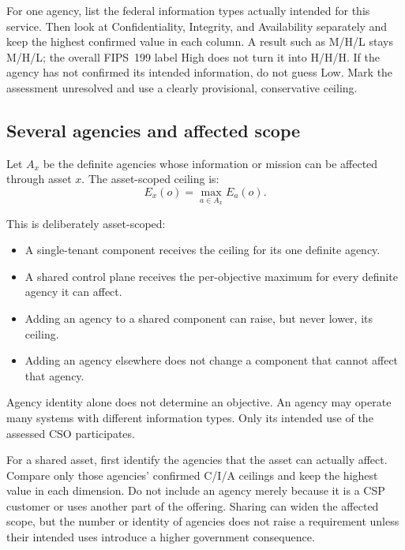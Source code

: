 \documentclass[11pt]{article}
\begin{document}
\begin{plain}
For one agency, list the federal information types actually intended for this
service. Then look at Confidentiality, Integrity, and Availability separately and
keep the highest confirmed value in each column. A result such as M/H/L stays
M/H/L; the overall FIPS~199 label High does not turn it into H/H/H. If the agency
has not confirmed its intended information, do not guess Low. Mark the assessment
unresolved and use a clearly provisional, conservative ceiling.
\end{plain}

\subsection{Several agencies and affected scope}

Let $A_x$ be the definite agencies whose information or mission can be affected
through asset $x$. The asset-scoped ceiling is:
\begin{equation}
E_x(o)=\max_{a\in A_x}E_a(o).
\label{eq:asset-ceiling}
\end{equation}

This is deliberately asset-scoped:

\begin{itemize}[leftmargin=1.5em]
\item A single-tenant component receives the ceiling for its one definite agency.
\item A shared control plane receives the per-objective maximum for every definite
  agency it can affect.
\item Adding an agency to a shared component can raise, but never lower, its ceiling.
\item Adding an agency elsewhere does not change a component that cannot affect
  that agency.
\end{itemize}

Agency identity alone does not determine an objective. An agency may operate many
systems with different information types. Only its intended use of the assessed CSO
participates.

\begin{plain}
For a shared asset, first identify the agencies that the asset can actually affect.
Compare only those agencies' confirmed C/I/A ceilings and keep the highest value in
each dimension. Do not include an agency merely because it is a CSP customer or
uses another part of the offering. Sharing can widen the affected scope, but the
number or identity of agencies does not raise a requirement unless their intended
uses introduce a higher government consequence.
\end{plain}
\end{document}
